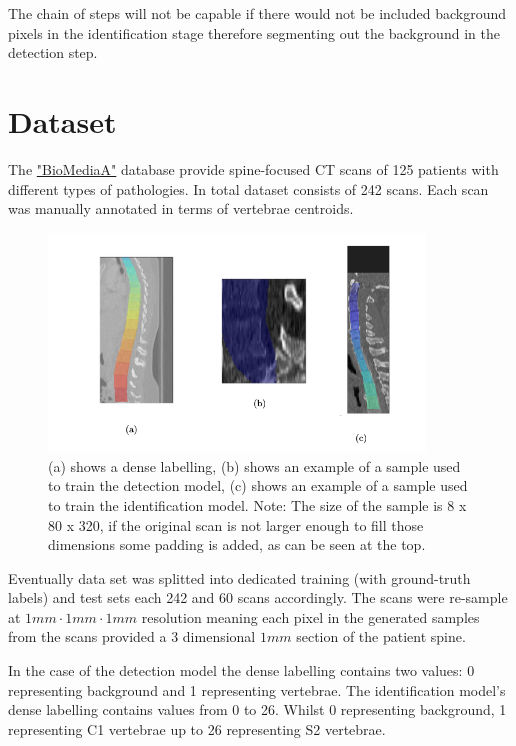 The chain of steps will not be capable if there would not be included background pixels in the identification stage therefore segmenting out the background in the detection step.


\section{Dataset}
The \href{https://biomedia.doc.ic.ac.uk/}{\color{blue}"BioMediaA"} database provide spine-focused CT scans of 125 patients with different types of pathologies. In total dataset consists of 242 scans. Each scan was manually annotated in terms of vertebrae centroids. 

\begin{figure}[h]
    \centering \includegraphics[width=10cm]{images/labeled_data.png}
    \caption {(a) shows a dense labelling, (b) shows an example of a sample used to train the detection model, (c) shows an example of a sample used to train the identification model. Note: The size of the sample is 8 x 80 x 320, if the original scan is not larger enough to fill those dimensions some padding is added, as can be seen at the top.}
    \label{fig:labeled_data}
\end{figure}

Eventually data set was splitted into dedicated training (with ground-truth labels) and test sets each 242 and 60 scans accordingly. The scans were re-sample at $1mm \cdot 1mm \cdot 1mm$ resolution meaning each pixel in the generated samples from the scans provided a 3 dimensional $1mm$ section of the patient spine.

In the case of the detection model the dense labelling contains two values: 0 representing background and 1 representing vertebrae. The identification model’s dense labelling contains values from 0 to 26. Whilst 0 representing background, 1 representing C1 vertebrae up to 26 representing S2 vertebrae.



